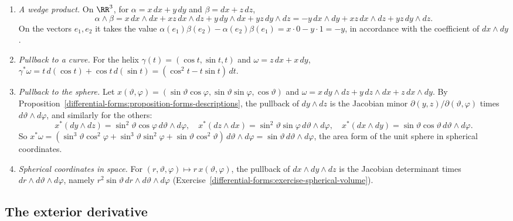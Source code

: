 \begin{example}\label{differential-forms:example-form-computations}
\begin{enumerate}
\item \emph{A wedge product.} On $\RR^3$, for $\alpha = x\,dx + y\,dy$ and $\beta = dx + z\,dz$,
\[
\alpha \wedge \beta = x\,dx \wedge dx + xz\,dx \wedge dz + y\,dy \wedge dx + yz\,dy \wedge dz = -y\,dx \wedge dy + xz\,dx \wedge dz + yz\,dy \wedge dz .
\]
On the vectors $e_1, e_2$ it takes the value $\alpha(e_1)\beta(e_2) - \alpha(e_2)\beta(e_1) = x \cdot 0 - y \cdot 1 = -y$, in accordance with the coefficient of $dx \wedge dy$.
\item \emph{Pullback to a curve.} For the helix $\gamma(t) = (\cos t, \sin t, t)$ and $\omega = z\,dx + x\,dy$,
$\gamma^*\omega = t\,d(\cos t) + \cos t\,d(\sin t) = (\cos^2t - t\sin t)\,dt$.
\item \emph{Pullback to the sphere.} Let $x(\vartheta, \varphi) = (\sin\vartheta\cos\varphi, \sin\vartheta\sin\varphi, \cos\vartheta)$ and $\omega = x\,dy \wedge dz + y\,dz \wedge dx + z\,dx \wedge dy$. By
Proposition~\ref{differential-forms:proposition-forms-descriptions}, the pullback of $dy \wedge dz$ is the Jacobian minor $\partial(y, z)/\partial(\vartheta, \varphi)$ times
$d\vartheta \wedge d\varphi$, and similarly for the others:
\[
x^*(dy \wedge dz) = \sin^2\vartheta\cos\varphi\,d\vartheta \wedge d\varphi, \quad x^*(dz \wedge dx) = \sin^2\vartheta\sin\varphi\,d\vartheta \wedge d\varphi, \quad
x^*(dx \wedge dy) = \sin\vartheta\cos\vartheta\,d\vartheta \wedge d\varphi .
\]
So $x^*\omega = (\sin^3\vartheta\cos^2\varphi + \sin^3\vartheta\sin^2\varphi + \sin\vartheta\cos^2\vartheta)\,d\vartheta \wedge d\varphi = \sin\vartheta\,d\vartheta \wedge d\varphi$, the area form of the
unit sphere in spherical coordinates.
\item \emph{Spherical coordinates in space.} For $(r, \vartheta, \varphi) \mapsto r\,x(\vartheta, \varphi)$, the pullback of $dx \wedge dy \wedge dz$ is the Jacobian determinant times
$dr \wedge d\vartheta \wedge d\varphi$, namely $r^2\sin\vartheta\,dr \wedge d\vartheta \wedge d\varphi$ (Exercise~\ref{differential-forms:exercise-spherical-volume}).
\end{enumerate}
\end{example}

\subsection{The exterior derivative}\label{differential-forms:subsection-exterior-derivative}

